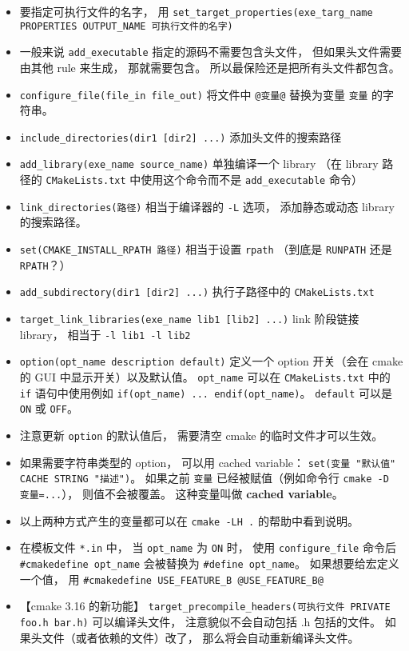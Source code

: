 \begin{itemize}
\item 要指定可执行文件的名字， 用 \verb|set_target_properties(exe_targ_name PROPERTIES OUTPUT_NAME 可执行文件的名字)|
\item 一般来说 \verb|add_executable| 指定的源码不需要包含头文件， 但如果头文件需要由其他 rule 来生成， 那就需要包含。 所以最保险还是把所有头文件都包含。
\item \verb`configure_file(file_in file_out)` 将文件中 \verb`@变量@` 替换为变量 \verb`变量` 的字符串。
\item \verb`include_directories(dir1 [dir2] ...)` 添加头文件的搜索路径
\item \verb`add_library(exe_name source_name)` 单独编译一个 library （在 library 路径的 \verb|CMakeLists.txt| 中使用这个命令而不是 \verb`add_executable` 命令）
\item \verb|link_directories(路径)| 相当于编译器的 \verb`-L` 选项， 添加静态或动态 library 的搜索路径。
\item \verb|set(CMAKE_INSTALL_RPATH 路径)| 相当于设置 \verb|rpath| （到底是 \verb|RUNPATH| 还是 \verb|RPATH|？）
\item \verb`add_subdirectory(dir1 [dir2] ...)` 执行子路径中的 \verb|CMakeLists.txt|
\item \verb`target_link_libraries(exe_name lib1 [lib2] ...)` link 阶段链接 library， 相当于 \verb|-l lib1 -l lib2|
\item \verb`option(opt_name description default)` 定义一个 option 开关（会在 cmake 的 GUI 中显示开关）以及默认值。 \verb`opt_name` 可以在 \verb|CMakeLists.txt| 中的 \verb`if` 语句中使用例如 \verb`if(opt_name) ... endif(opt_name)`。 \verb`default` 可以是 \verb`ON` 或 \verb`OFF`。
\item 注意更新 \verb|option| 的默认值后， 需要清空 cmake 的临时文件才可以生效。
\item 如果需要字符串类型的 option， 可以用 cached variable： \verb|set(变量 "默认值" CACHE STRING "描述")|。 如果之前 \verb|变量| 已经被赋值（例如命令行 \verb|cmake -D 变量=...|）， 则值不会被覆盖。 这种变量叫做 \textbf{cached variable}。
\item 以上两种方式产生的变量都可以在 \verb|cmake -LH .| 的帮助中看到说明。
\item 在模板文件 \verb`*.in` 中， 当 \verb`opt_name` 为 \verb`ON` 时， 使用 \verb|configure_file| 命令后 \verb`#cmakedefine opt_name` 会被替换为 \verb`#define opt_name`。 如果想要给宏定义一个值， 用 \verb`#cmakedefine USE_FEATURE_B @USE_FEATURE_B@`
\item 【cmake 3.16 的新功能】 \verb|target_precompile_headers(可执行文件 PRIVATE foo.h bar.h)| 可以编译头文件， 注意貌似不会自动包括 .h 包括的文件。 如果头文件（或者依赖的文件）改了， 那么将会自动重新编译头文件。

\end{itemize}
